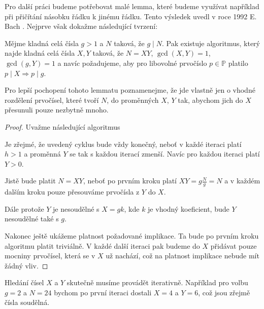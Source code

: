 Pro další práci budeme potřebovat malé lemma, které budeme využívat
například při přičítání násobku řádku k jinému řádku. Tento výsledek uvedl
v roce 1992 E. Bach \cite{Bach}. Nejprve však dokažme následující tvrzení:

\begin{lem} \label{factorization}
    Mějme kladná celá čísla $ g > 1 $ a $ N $ taková, že $ g \mid N $. Pak
    existuje algoritmus, který najde kladná celá čísla $ X, Y $ taková, že
    $ N = XY $, $ \gcd(X, Y) = 1 $, $ \gcd(g, Y) = 1 $ a navíc požadujeme, aby
    pro libovolné prvočíslo $ p \in \mathbb{P} $ platilo
    $ p \mid X \Rightarrow p \mid g $.
\end{lem}
\begin{pozn}
Pro lepší pochopení tohoto lemmatu poznamenejme, že jde vlastně jen o vhodné
rozdělení prvočísel, které tvoří $ N $, do proměnných $ X $, $ Y $ tak, abychom
jich do $ X $ přesunuli pouze nezbytně mnoho.
\end{pozn}
\begin{proof}
    Uvažme následující algoritmus\\
    \begin{algorithm}[H] \label{factorization_Algo}
    \end{algorithm}

    Je zřejmé, že uvedený cyklus bude vždy konečný, neboť v každé iteraci platí
    $ h > 1 $ a proměnná $ Y $ se tak s každou iterací zmenší. Navíc pro každou
    iteraci platí $ Y > 0 $.

    Jistě bude platit $ N = XY $, neboť po prvním kroku platí
    $ XY = g \frac{N}{g} = N $ a v každém dalším kroku pouze přesouváme
    prvočísla z $ Y $ do $ X $.

    Dále protože $ Y $ je nesoudělné s $ X = gk $, kde $ k $ je vhodný koeficient,
    bude $ Y $ nesoudělné také s $ g $.

    Nakonec ještě ukážeme platnost požadované implikace. Ta bude po prvním kroku
    algoritmu platit triviálně. V každé další iteraci pak budeme do $ X $
    přidávat pouze mocniny prvočísel, která se v $ X $ už nachází, což na platnost
    implikace nebude mít žádný vliv.
\end{proof}
\begin{pozn}
Hledání čísel $ X $ a $ Y $ skutečně musíme provádět iterativně. Například pro
volbu $ g = 2 $ a $ N = 24 $ bychom po první iteraci dostali $ X = 4 $ a $ Y = 6 $,
což jsou zřejmě čísla soudělná.
\end{pozn}

